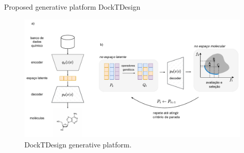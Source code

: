 \documentclass[aspectratio=169,xcolor=dvipsnames]{beamer}
\begin{document}
\begin{frame}{Proposed generative platform \hfill {\footnotesize \alert{DockTDesign}}}
    \begin{figure}
        \centering
        \includegraphics[width=.825\linewidth]{imgs/generative-framework.pdf}
        \vspace{-0.5em}
        \caption{DockTDesign generative platform.}
    \end{figure}
\end{frame}
\end{document}
